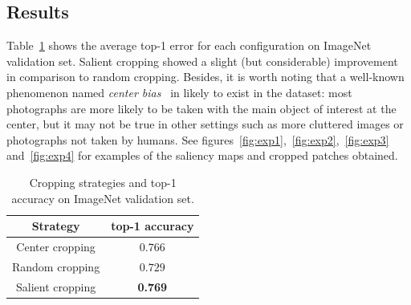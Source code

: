\documentclass[English]{style/ic-tese-v3}
\begin{document}
\subsection{Results}
Table~\ref{table:results} shows the average top-1 error for each configuration on ImageNet validation set.
Salient cropping showed a slight (but considerable) improvement in comparison to random cropping.
Besides, it is worth noting that a well-known phenomenon named \emph{center bias}~\cite{ref:centerbias}
in likely to exist in
the dataset: most photographs are more likely to be taken with the main object of interest at the center,
but it may not be true in other settings such as more cluttered images or photographs not taken by humans.
See figures~\ref{fig:exp1},~\ref{fig:exp2},~\ref{fig:exp3} and~\ref{fig:exp4}
for examples of the saliency maps and cropped patches obtained.

\begin{table}[H]
\centering
	\small
\caption{Cropping strategies and top-1 accuracy on ImageNet validation set.}
\begin{tabular}{|c|c|}
	\hline
    Strategy & top-1 accuracy\\
    \hline
    Center cropping & $0.766$\\
    \hline
    Random cropping & $0.729$\\
    \hline
    Salient cropping & \textbf{0.769}\\
    \hline
\end{tabular}
\label{table:results}
\end{table}
\end{document}
